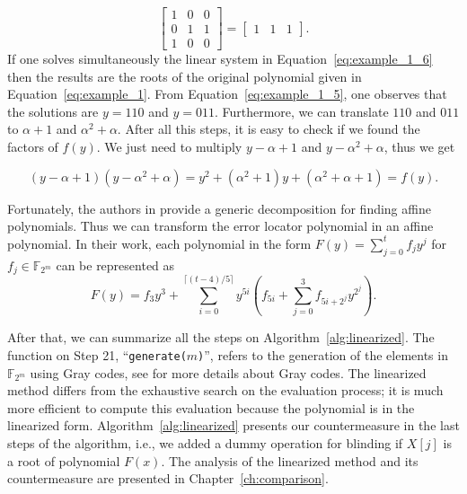 \begin{example}
\begin{equation}
    \begin{bmatrix}
    1 & 0 & 0 \\
    0 & 1 & 1 \\
    1 & 0 & 0
    \end{bmatrix}
    =
    \begin{bmatrix} 1 & 1 & 1 \end{bmatrix}.
\end{equation}
If one solves simultaneously the linear system in Equation~\ref{eq:example_1_6} then the results are the roots of the original polynomial given in Equation~\ref{eq:example_1}. From Equation~\ref{eq:example_1_5}, one observes that the solutions are $y=110$ and $y=011$. Furthermore, we can translate $110$ and $011$ to $\alpha + 1$ and $\alpha^2 + \alpha$. After all this steps, it is easy to check if we found the factors of $f(y)$. We just need to multiply $y - \alpha + 1$ and $y- \alpha^2 + \alpha$, thus we get

\begin{equation*}\label{eq:example_1_7}
    (y - \alpha + 1) (y - \alpha^2 + \alpha) = y^2 + (\alpha^2+1)y + (\alpha^2 +\alpha +1) = f(y).
\end{equation*}
\end{example}

Fortunately, the authors in \cite{fedorenko2002finding} provide a generic decomposition for finding affine polynomials. Thus we can transform the error locator polynomial in an affine polynomial. In their work, each polynomial in the form $F(y) = \sum_{j=0}^{t} f_jy^j$ for $f_j \in \mathbb{F}_{2^m}$ can be represented as
\begin{equation}
\label{eq:f_y}
    F(y) = f_3y^3 + \sum_{i=0}^{\lceil (t-4)/5 \rceil} y^{5i}(f_{5i} + \sum_{j=0}^{3} f_{5i+2^j}y^{2^j}).
\end{equation}

After that, we can summarize all the steps on Algorithm~\ref{alg:linearized}. The function on Step 21, ``\texttt{generate($m$)}'', refers to the generation of the elements in $\mathbb{F}_{2^m}$ using Gray codes, see \cite{savage1997survey} for more details about Gray codes. The linearized method differs from the exhaustive search on the evaluation process; it is much more efficient to compute this evaluation because the polynomial is in the linearized form. Algorithm~\ref{alg:linearized} presents our countermeasure in the last steps of the algorithm, i.e., we added a dummy operation for blinding if $X[j]$ is a root of polynomial $F(x)$. The analysis of the linearized method and its countermeasure are presented in Chapter~\ref{ch:comparison}.

